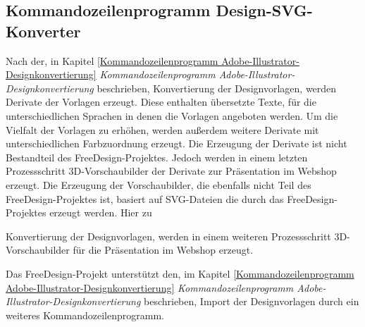 \subsection{Kommandozeilenprogramm Design-SVG-Konverter}
Nach der, in Kapitel \ref{Kommandozeilenprogramm Adobe-Illustrator-Designkonvertierung} \emph{Kommandozeilenprogramm Adobe-Illustrator-Designkonvertierung} beschrieben, Konvertierung der Designvorlagen, werden Derivate der Vorlagen erzeugt. Diese enthalten übersetzte Texte, für die unterschiedlichen Sprachen in denen die Vorlagen angeboten werden. Um die Vielfalt der Vorlagen zu erhöhen, werden außerdem weitere Derivate mit unterschiedlichen Farbzuordnung erzeugt. Die Erzeugung der Derivate ist nicht Bestandteil des FreeDesign-Projektes. Jedoch werden in einem letzten Prozessschritt 3D-Vorschaubilder der Derivate zur Präsentation im Webshop erzeugt. Die Erzeugung der Vorschaubilder, die ebenfalls nicht Teil des FreeDesign-Projektes ist, basiert auf SVG-Dateien die durch das FreeDesign-Projektes erzeugt werden. Hier zu 


Konvertierung der Designvorlagen, werden in einem weiteren Prozessschritt 3D-Vorschaubilder für die Präsentation im Webshop erzeugt. 

Das FreeDesign-Projekt unterstützt den, im Kapitel \ref{Kommandozeilenprogramm Adobe-Illustrator-Designkonvertierung} \emph{Kommandozeilenprogramm Adobe-Illustrator-Designkonvertierung} beschrieben, Import der Designvorlagen durch ein weiteres Kommandozeilenprogramm. 

